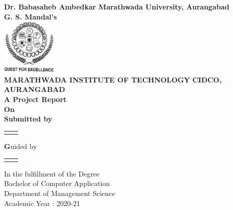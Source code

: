 \documentclass[12pt, a4paper]{report}
\begin{document}
	\renewcommand\bibname{References} %
	

\begin{titlepage}
	
	\begin{center}
		\Large \textbf {Dr. Babasaheb Ambedkar Marathwada University, Aurangabad}\\[0.2in]
		\small \textbf{G. S. Mandal’s} \\
		\vspace{.1in}
		\includegraphics[width=0.20\textwidth]{./mit}\\[0.1in]
		\textbf {MARATHWADA INSTITUTE OF TECHNOLOGY}
		\textbf{CIDCO, AURANGABAD}\\
		
		\vspace{1cm}
		\normalsize \bf A Project Report \\ On \\
		\vspace{1cm}
		\bf Submitted by \\
		\vspace{1cm}
		\begin{table}[h]
			\centering
			\begin{tabular}{lr}\hline \\
				
			\end{tabular}
		\end{table}
		
		\textbf Guided by \\
		\vspace{1cm}
		\begin{table}[h]
			\centering
			\begin{tabular}{lr}\hline \\
				
			\end{tabular}
		\end{table}
		
		\vspace{.1in}
		\normalsize
		In the fulfillment of the Degree\\ Bachelor of Computer Application\\
		Department of Management Science \\Academic Year : 2020-21\\[0.2in]
		
		
	\end{center}
	
\end{titlepage}
\end{document}
